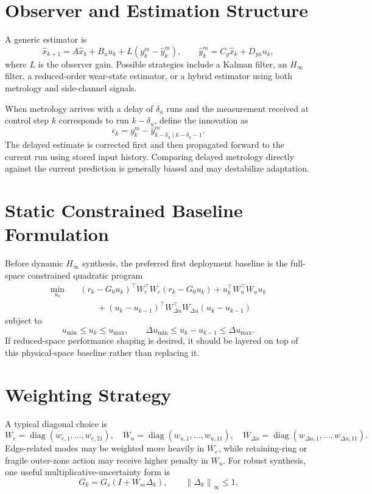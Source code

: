 \documentclass[11pt,a4paper]{article}
\newcommand{\norm}[1]{\left\lVert #1 \right\rVert}
\newcommand{\diag}{\operatorname{diag}}
\begin{document}
\section{Observer and Estimation Structure}
A generic estimator is
\[
\hat x_{k+1}=A\hat x_k+B_u u_k+L(y_k^m-\hat y_k^m),\qquad \hat y_k^m=C_y\hat x_k+D_{yu}u_k,
\]
where $L$ is the observer gain. Possible strategies include a Kalman filter, an $H_{\infty}$ filter, a reduced-order wear-state estimator, or a hybrid estimator using both metrology and side-channel signals.

When metrology arrives with a delay of $\delta_u$ runs and the measurement received at control step $k$ corresponds to run $k-\delta_u$, define the innovation as
\[
\epsilon_k=y_k^m-\hat y^{m}_{k-\delta_u\mid k-\delta_u-1}.
\]
The delayed estimate is corrected first and then propagated forward to the current run using stored input history. Comparing delayed metrology directly against the current prediction is generally biased and may destabilize adaptation.

\section{Static Constrained Baseline Formulation}
Before dynamic $H_{\infty}$ synthesis, the preferred first deployment baseline is the full-space constrained quadratic program
\begin{align*}
\min_{u_k}\quad &(r_k-G_0u_k)^\top W_e^\top W_e(r_k-G_0u_k)+u_k^\top W_u^\top W_u u_k\\
&\qquad +(u_k-u_{k-1})^\top W_{\Delta u}^\top W_{\Delta u}(u_k-u_{k-1})
\end{align*}
subject to
\[
u_{\min}\le u_k\le u_{\max},\qquad \Delta u_{\min}\le u_k-u_{k-1}\le \Delta u_{\max}.
\]
If reduced-space performance shaping is desired, it should be layered on top of this physical-space baseline rather than replacing it.

\section{Weighting Strategy}
A typical diagonal choice is
\[
W_e=\diag(w_{e,1},\dots,w_{e,21}),\quad W_u=\diag(w_{u,1},\dots,w_{u,11}),\quad W_{\Delta u}=\diag(w_{\Delta u,1},\dots,w_{\Delta u,11}).
\]
Edge-related modes may be weighted more heavily in $W_e$, while retaining-ring or fragile outer-zone action may receive higher penalty in $W_u$. For robust synthesis, one useful multiplicative-uncertainty form is
\[
G_k=G_s(I+W_m\Delta_k),\qquad \norm{\Delta_k}_{\infty}\le 1.
\]
\end{document}
